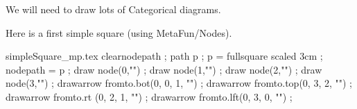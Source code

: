

We will need to draw lots of Categorical diagrams.

Here is a first simple square (using MetaFun/Nodes).

\begin{lpil:metaFun}{simpleSquare_mp.tex}
\startMPpage
clearnodepath ;
path p ; p = fullsquare scaled 3cm ;
nodepath = p ;
draw node(0,"") ;
draw node(1,"") ;
draw node(2,"") ;
draw node(3,"") ;
drawarrow fromto.bot(0, 0, 1, "") ;
drawarrow fromto.top(0, 3, 2, "") ;
drawarrow fromto.rt (0, 2, 1, "") ;
drawarrow fromto.lft(0, 3, 0, "") ;
\stopMPpage
\end{lpil:metaFun}

